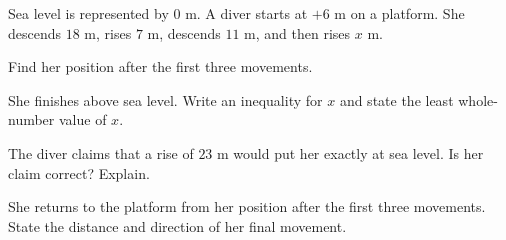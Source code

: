  Sea level is represented by $0$ m. A diver starts at $+6$ m on a platform. She descends $18$ m, rises $7$ m, descends $11$ m, and then rises $x$ m.
\begin{subparts}
  \item Find her position after the first three movements.
  \item She finishes above sea level. Write an inequality for $x$ and state the least whole-number value of $x$.
  \item The diver claims that a rise of $23$ m would put her exactly at sea level. Is her claim correct? Explain.
  \item She returns to the platform from her position after the first three movements. State the distance and direction of her final movement.
\end{subparts}

